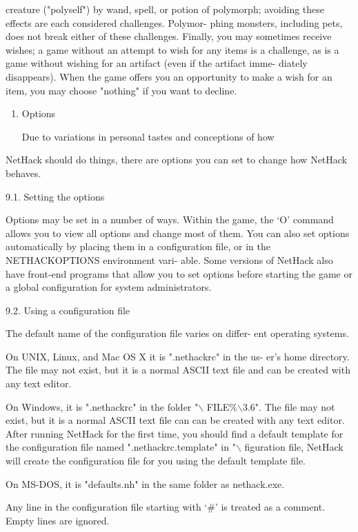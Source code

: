 \documentclass[11pt]{article}
\begin{document}
creature ("polyself") by wand, spell, or potion of polymorph;
avoiding these effects are each considered challenges. Polymor-
phing monsters, including pets, does not break either of these
challenges.  Finally, you may sometimes receive wishes; a game
without an attempt to wish for any items is a challenge, as is a
game without wishing for an artifact (even if the artifact imme-
diately disappears). When the game offers you an opportunity to
make a wish for an item, you may choose "nothing" if you want to
decline.

\begin{enumerate}
\item Options

Due to variations in personal tastes and conceptions of how
\end{enumerate}
NetHack should do things, there are options you can set to change
how NetHack behaves.

9.1. Setting the options

   Options may be set in a number of ways.  Within the game,
the `O' command allows you to view all options and change most of
them. You can also set options automatically by placing them in
a configuration file, or in the NETHACKOPTIONS environment vari-
able. Some versions of NetHack also have front-end programs that
allow you to set options before starting the game or a global
configuration for system administrators.

9.2. Using a configuration file

   The default name of the configuration file varies on differ-
ent operating systems.

   On UNIX, Linux, and Mac OS X it is ".nethackrc" in the us-
er's home directory. The file may not exist, but it is a normal
ASCII text file and can be created with any text editor.

   On Windows, it is ".nethackrc" in the folder "$\backslash$%
FILE\%\NetHack$\backslash$3.6". The file may not exist, but it is a normal
ASCII text file can can be created with any text editor. After
running NetHack for the first time, you should find a default
template for the configuration file named ".nethackrc.template"
in "$\backslash$%
figuration file, NetHack will create the configuration file for
you using the default template file.

   On MS-DOS, it is "defaults.nh" in the same folder as
nethack.exe.

   Any line in the configuration file starting with `\#' is
treated as a comment. Empty lines are ignored.
\end{document}
